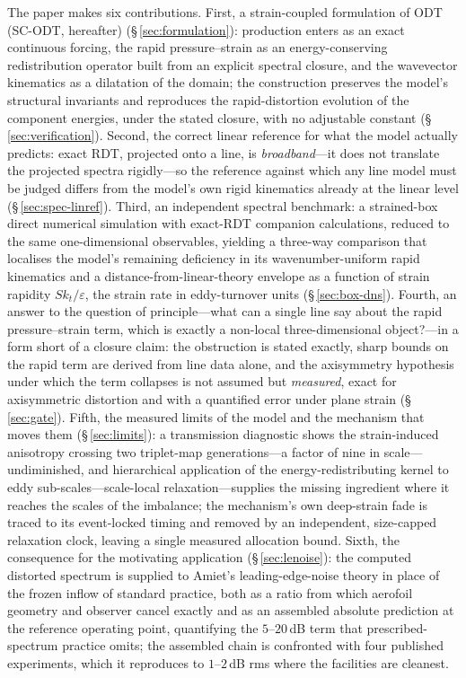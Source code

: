 \documentclass[lineno]{JFM-FLM_Au}
\begin{document}
The paper makes six contributions.
First, a strain-coupled formulation of ODT (SC-ODT, hereafter)
(\S\,\ref{sec:formulation}):
production enters as an exact continuous forcing, the rapid
pressure--strain as an energy-conserving redistribution operator built
from an explicit spectral closure, and the wavevector kinematics as a
dilatation of the domain; the construction preserves the model's
structural invariants and reproduces the rapid-distortion evolution of
the component energies, under the stated closure, with no adjustable
constant (\S\,\ref{sec:verification}). Second, the correct linear
reference for what the model actually predicts: exact RDT, projected
onto a line, is \emph{broadband}---it does not translate the projected
spectra rigidly---so the reference against which any line model must be
judged differs from the model's own rigid kinematics already at the
linear level (\S\,\ref{sec:spec-linref}). Third, an independent spectral
benchmark: a strained-box direct numerical simulation with exact-RDT
companion calculations, reduced to the same one-dimensional observables,
yielding a three-way comparison that localises the model's remaining
deficiency in its wavenumber-uniform rapid kinematics and a
distance-from-linear-theory envelope as a function of strain rapidity
$Sk_t/\varepsilon$, the strain rate in eddy-turnover units
(\S\,\ref{sec:box-dns}). Fourth, an answer to the question of
principle---what can a single line say about the rapid pressure--strain
term, which is exactly a non-local three-dimensional object?---in a form short of a closure claim: the obstruction is stated
exactly, sharp bounds on the rapid term are derived from line data
alone, and the axisymmetry hypothesis under which the term collapses is
not assumed but \emph{measured}, exact for axisymmetric distortion and
with a quantified error under plane strain (\S\,\ref{sec:gate}). Fifth,
the measured limits of the model and the mechanism that moves them
(\S\,\ref{sec:limits}): a transmission diagnostic shows the
strain-induced anisotropy crossing two triplet-map generations---a
factor of nine in scale---undiminished, and hierarchical application of the
energy-redistributing kernel to eddy sub-scales---scale-local
relaxation---supplies the missing ingredient where it reaches the
scales of the imbalance; the mechanism's own deep-strain fade is
traced to its event-locked timing and removed by an independent,
size-capped relaxation clock, leaving a single measured allocation
bound. Sixth, the
consequence for the motivating application (\S\,\ref{sec:lenoise}):
the computed distorted spectrum is supplied to Amiet's
leading-edge-noise theory in place of the frozen inflow of standard
practice, both as a ratio from which aerofoil geometry and observer
cancel exactly and as an assembled absolute prediction at the
reference operating point, quantifying the
$5$--$20$\,dB term that prescribed-spectrum practice omits; the
assembled chain is confronted with four published experiments, which
it reproduces to $1$--$2$\,dB rms where the facilities are cleanest.
\end{document}
